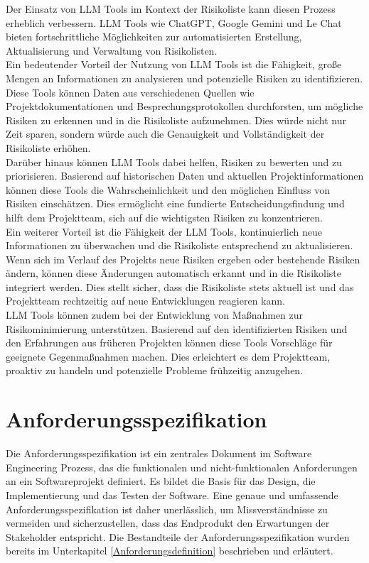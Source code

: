 Der Einsatz von LLM Tools im Kontext der Risikoliste kann diesen Prozess erheblich verbessern. LLM Tools wie ChatGPT, 
Google Gemini und Le Chat bieten fortschrittliche Möglichkeiten zur automatisierten Erstellung, Aktualisierung und 
Verwaltung von Risikolisten.\\

Ein bedeutender Vorteil der Nutzung von LLM Tools ist die Fähigkeit, große Mengen an Informationen zu analysieren und 
potenzielle Risiken zu identifizieren. Diese Tools können Daten aus verschiedenen Quellen wie Projektdokumentationen und 
Besprechungsprotokollen durchforsten, um mögliche Risiken zu erkennen und in die Risikoliste aufzunehmen. Dies würde 
nicht nur Zeit sparen, sondern würde auch die Genauigkeit und Vollständigkeit der Risikoliste erhöhen.\\

Darüber hinaus können LLM Tools dabei helfen, Risiken zu bewerten und zu priorisieren. Basierend auf historischen Daten 
und aktuellen Projektinformationen können diese Tools die Wahrscheinlichkeit und den möglichen Einfluss von Risiken 
einschätzen. Dies ermöglicht eine fundierte Entscheidungsfindung und hilft dem Projektteam, sich auf die wichtigsten 
Risiken zu konzentrieren.\\

Ein weiterer Vorteil ist die Fähigkeit der LLM Tools, kontinuierlich neue Informationen zu überwachen und die 
Risikoliste entsprechend zu aktualisieren. Wenn sich im Verlauf des Projekts neue Risiken ergeben oder bestehende 
Risiken ändern, können diese Änderungen automatisch erkannt und in die Risikoliste integriert werden. Dies stellt 
sicher, dass die Risikoliste stets aktuell ist und das Projektteam rechtzeitig auf neue Entwicklungen reagieren kann.\\

LLM Tools können zudem bei der Entwicklung von Maßnahmen zur Risikominimierung unterstützen. Basierend auf den 
identifizierten Risiken und den Erfahrungen aus früheren Projekten können diese Tools Vorschläge für geeignete 
Gegenmaßnahmen machen. Dies erleichtert es dem Projektteam, proaktiv zu handeln und potenzielle Probleme frühzeitig 
anzugehen.

\section{Anforderungsspezifikation}  \label{Anforderungsspezifikation}

Die Anforderungsspezifikation ist ein zentrales Dokument im Software Engineering Prozess, das die funktionalen und 
nicht-funktionalen Anforderungen an ein Softwareprojekt definiert. Es bildet die Basis für das Design, die 
Implementierung und das Testen der Software. Eine genaue und umfassende Anforderungsspezifikation ist daher 
unerlässlich, um Missverständnisse zu vermeiden und sicherzustellen, dass das Endprodukt den Erwartungen der 
Stakeholder entspricht. Die Bestandteile der Anforderungsspezifikation wurden bereits im Unterkapitel 
\ref{Anforderungsdefinition} beschrieben und erläutert.\\

